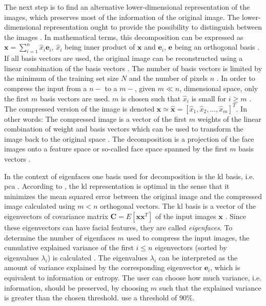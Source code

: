 The next step is to find an alternative lower-dimensional representation of the images, which preserves most of the information of the original image.
The lower-dimensional representation ought to provide the possibility to distinguish between the images \cite{eigenfaces1991}.
In mathematical terms, this decomposition can be expressed as 
$\textbf{x} = \sum_{i=1}^{n}\hat{x}_{i} \textbf{e}_{i}$, 
$\hat{x}_{i}$ being inner product of $\textbf{x}$ and $\textbf{e}_{i}$, 
$\textbf{e}$ being an orthogonal basis 
\cite{eigenfaces1997}.
If all basis vectors are used, the original image can be reconstructed using a linear combination of the basis vectors \cite{eigenfaces1991, face-recognition2020}.
The number of basis vectors is limited by the minimum of the training set size $N$ \cite{eigenfaces1991} and the number of pixels $n$ \cite{face-recognition2020}.
In order to compress the input from a $n-$ to a $m-$, given $m \ll n$, dimensional space, only the first $m$ basis vectors are used.
$m$ is chosen such that $\hat{x}_{i}$ is small for $i \ge m$ \cite{eigenfaces1997}.
The compressed version of the image is denoted $\textbf{x} \simeq \hat{\textbf{x}} = \left[\hat{x}_{1}, \hat{x}_{2}, ..., \hat{x}_{m}  \right]^{T}$.
In other words: 
The compressed image is a vector of the first $m$ weights of the linear combination of weight and basis vectors which can be used to transform the image back to the original space \cite{eigenfaces1991}.
The decomposition is a projection of the face images onto a feature space or so-called face space spanned by the first $m$ basis vectors \cite{eigenfaces1991}.

In the context of eigenfaces one basis used for decomposition is the \ac{kl} basis, i.e. \ac{pca} \cite{eigenfaces1997, eigenfaces1991}.
According to \citeauthor{eigenfaces1997}, the \ac{kl} representation is optimal in the sense that it minimizes the mean squared error between the original image and 
the compressed image calculated using $m < n$ orthogonal vectors.
The \ac{kl} basis is a vector of the eigenvectors of covariance matrix $\textbf{C} = E\left[ \textbf{x}\textbf{x}^{T} \right]$ of the input images $\mathbf{x}$ \cite{eigenfaces1997}.
Since these eigenvectors can have facial features, they are called \textit{eigenfaces}.
To determine the number of eigenfaces $m$ used to compress the input images, the cumulative explained variance of the first $i \le n$ eigenvectors (sorted by eigenvalues $\lambda_i$) is calculated 
\cite{eigenfaces1997, face-recognition2020, face-recognition2021}.
The eigenvalues $\lambda_i$ can be interpreted as the amount of variance explained by the corresponding eigenvector $\textbf{e}_i$, which is equivalent to information or entropy.
The user can choose how much variance, i.e. information, should be preserved, by choosing $m$ such that the explained variance is greater than the chosen threshold.
\citeauthor{face-recognition2021} use a threshold of 90\%.

